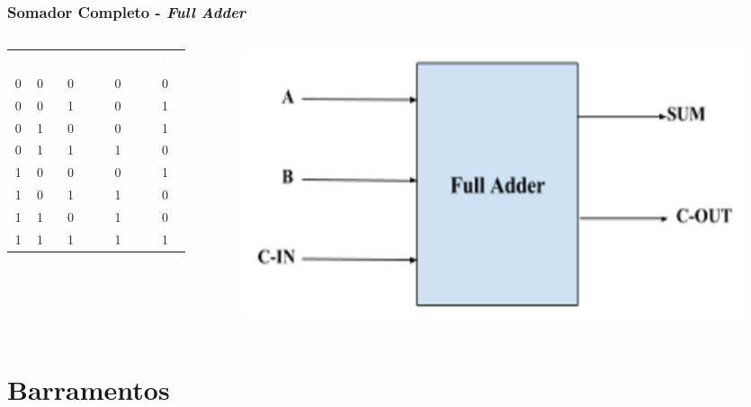 \documentclass[aspectratio=169,
				xcolor=table]{beamer}
\begin{document}
		\begin{frame}
			\frametitle{Somador Completo - \textit{Full Adder}}
			\begin{columns}
				\begin{column}{0.3\textwidth}
					\begin{eftable}
						\begin{tabular}{c|c|c||c|c}				
							\textcolor{white}{A} & 		
							\textcolor{white}{B} & 		
							\textcolor{white}{C-IN} & 		
							\textcolor{white}{C-OUT} & 		
							\textcolor{white}{SUM} \\ 
							0 & 0 & 0 & 0 & 0 \\ 
							0 & 0 & 1 & 0 & 1 \\ 
							0 & 1 & 0 & 0 & 1 \\ 
							0 & 1 & 1 & 1 & 0 \\ 
							1 & 0 & 0 & 0 & 1 \\ 
							1 & 0 & 1 & 1 & 0 \\ 
							1 & 1 & 0 & 1 & 0 \\ 
							1 & 1 & 1 & 1 & 1 \\ 
						\end{tabular} 
					\end{eftable}
				\end{column}
				\begin{column}{0.7\textwidth}
					\begin{figure}
						\includegraphics[width=.8\textwidth, keepaspectratio]{../figs/cap05/fullAdder.png} 
					\end{figure}
				\end{column}
			\end{columns}			
			
		\end{frame}


	\section{Barramentos}	
	
\end{document}
